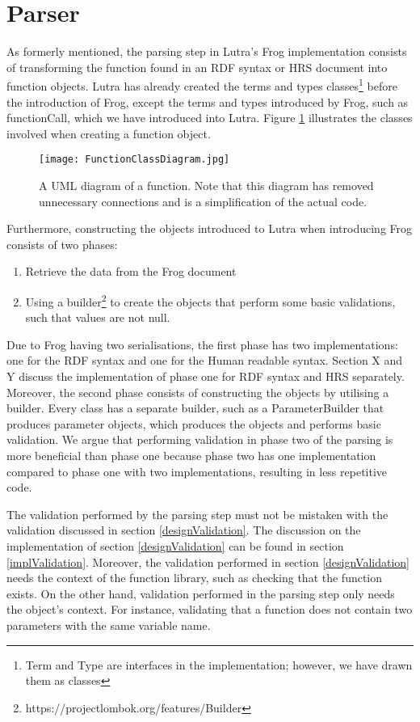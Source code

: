 \section{Parser}
\label{parser}
As formerly mentioned, the parsing step in Lutra's Frog implementation consists of transforming the function found in an RDF syntax or HRS document into function objects. Lutra has already created the terms and types classes\footnote{Term and Type are interfaces in the implementation; however, we have drawn them as classes} before the introduction of Frog, except the terms and types introduced by Frog, such as functionCall, which we have introduced into Lutra. Figure \ref{fig:FunctionClassDiagram} illustrates the classes involved when creating a function object.

\begin{figure}
  \centering
  \texttt{[image: FunctionClassDiagram.jpg]}
    \caption{A UML diagram of a function. Note that this diagram has removed unnecessary connections and is a simplification of the actual code.}
  \label{fig:FunctionClassDiagram}
\end{figure}

\para 
Furthermore, constructing the objects introduced to Lutra when introducing Frog consists of two phases:
\begin{enumerate}
  \item Retrieve the data from the Frog document
  \item Using a builder\footnote{https://projectlombok.org/features/Builder} to create the objects that perform some basic validations, such that values are not null. 
\end{enumerate}
Due to Frog having two serialisations, the first phase has two implementations: one for the RDF syntax and one for the Human readable syntax. Section X and Y discuss the implementation of phase one for RDF syntax and HRS separately. Moreover, the second phase consists of constructing the objects by utilising a builder. Every class has a separate builder, such as a ParameterBuilder that produces parameter objects, which produces the objects and performs basic validation. We argue that performing validation in phase two of the parsing is more beneficial than phase one because phase two has one implementation compared to phase one with two implementations, resulting in less repetitive code. 

\para
The validation performed by the parsing step must not be mistaken with the validation discussed in section \ref{designValidation}. The discussion on the implementation of section \ref{designValidation} can be found in section \ref{implValidation}. Moreover, the validation performed in section \ref{designValidation} needs the context of the function library, such as checking that the function exists. On the other hand, validation performed in the parsing step only needs the object's context. For instance, validating that a function does not contain two parameters with the same variable name. 

